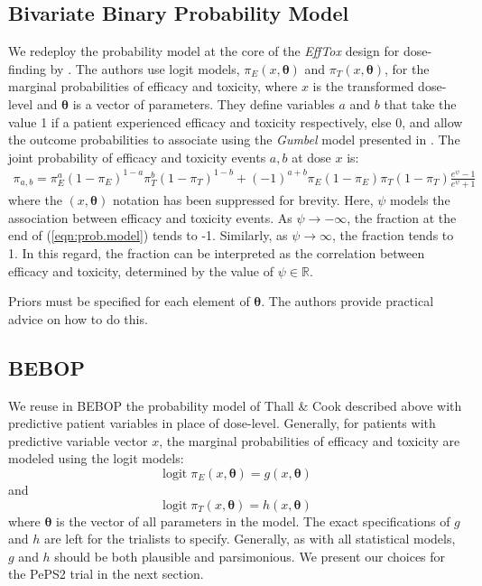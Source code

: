 \documentclass[alpha-refs]{wiley-article}
\DeclareMathOperator{\logit}{logit}
\begin{document}
\subsection{Bivariate Binary Probability Model}
We redeploy the probability model at the core of the \textit{EffTox} design for dose-finding by \cite{Thall2004} .
The authors use logit models, $\pi_E(x, \boldsymbol{\theta})$ and $\pi_T(x, \boldsymbol{\theta})$, for the marginal probabilities of efficacy and toxicity, where $x$ is the transformed dose-level and $\boldsymbol{\theta}$ is a vector of parameters.
They define variables $a$ and $b$ that take the value 1 if a patient experienced efficacy and toxicity respectively, else 0, and allow the outcome probabilities to associate using the \textit{Gumbel} model presented in \cite{Murtaugh1990}.
The joint probability of efficacy and toxicity events $a, b$ at dose $x$ is:
\begin{gather}
\label{eqn:prob.model}
\pi_{a,b} = \pi_E^a (1-\pi_E)^{1-a} \pi_T^b (1-\pi_T)^{1-b}+ (-1)^{a+b} \pi_E (1-\pi_E) \pi_T (1-\pi_T) \frac{e^\psi - 1}{e^\psi + 1}
\end{gather}
where the $(x, \boldsymbol{\theta})$ notation has been suppressed for brevity.
Here, $\psi$ models the association between efficacy and toxicity events.
As $\psi \to -\infty$, the fraction at the end of (\ref{eqn:prob.model}) tends to -1.
Similarly, as $\psi \to \infty$, the fraction tends to 1.
In this regard, the fraction can be interpreted as the correlation between efficacy and toxicity, determined by the value of $\psi \in \mathbb{R}$.

Priors must be specified for each element of $\boldsymbol{\theta}$.
The authors provide practical advice on how to do this\cite{Thall2004, Thall2014}.

\subsection{BEBOP}
\label{sec:bebop}
We reuse in BEBOP the probability model of Thall \& Cook described above with predictive patient variables in place of dose-level.
Generally, for patients with predictive variable vector $x$, the marginal probabilities of efficacy and toxicity are modeled using the logit models:
\begin{equation}
\label{eqn:bebop.efficacy}
\logit \pi_E(x, \boldsymbol{\theta}) = g(x, \boldsymbol{\theta})
\end{equation}
and 
\begin{equation}
\label{eqn:bebop.toxicity}
\logit \pi_T(x, \boldsymbol{\theta}) = h(x, \boldsymbol{\theta})
\end{equation}
where $\boldsymbol{\theta}$ is the vector of all parameters in the model.
The exact specifications of $g$ and $h$ are left for the trialists to specify.
Generally, as with all statistical models, $g$ and $h$ should be both plausible and parsimonious.
We present our choices for the PePS2 trial in the next section.
\end{document}
